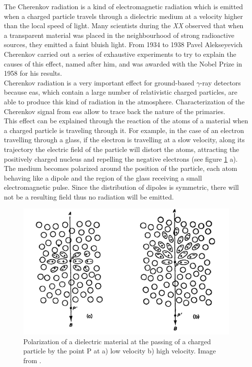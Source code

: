 \documentclass[main.tex]{subfiles}
\begin{document}
The Cherenkov radiation is a kind of electromagnetic radiation which is emitted when a charged particle travels through a dielectric medium at a velocity higher than the local speed of light. Many scientists during the \textit{XX}  observed that when a transparent material was placed in the neighbourhood of strong radioactive sources, they emitted a faint bluish light. From 1934 to 1938 Pavel Alekseyevich Cherenkov carried out a series of exhaustive experiments to try to explain the causes of this effect, named after him, and was awarded with the Nobel Prize in 1958 for his results.\\
Cherenkov radiation is a very important effect for ground-based $\gamma$-ray detectors because \gls{eas}, which contain a large number of relativistic charged particles, are able to produce this kind of radiation in the atmosphere. Characterization of the Cherenkov signal from \gls{eas} allow to trace back the nature of the primaries.\\
This effect can be explained through the reaction of the atoms of a material when a charged particle is traveling through it. For example, in the case of an electron travelling through a glass, if the electron is travelling at a slow velocity, along its trajectory the electric field of the particle will distort the atoms, attracting the positively charged nucleus and repelling the negative electrons (see figure \ref{fig:polarization} a). The medium becomes polarized around the position of the particle, each atom behaving like a dipole and the region of the glass receiving a small electromagnetic pulse. Since the distribution of dipoles  is symmetric, there will not be a resulting field thus no radiation will be emitted.

\begin{figure}[h]
    \centering
    \includegraphics[width=1\textwidth]{Pictures/polarization.pdf}
    \caption{Polarization of a dielectric material at the passing of a charged particle by the point P at a) low velocity b) high velocity. Image from \cite{jelley1958Cherenkov}.}
    \label{fig:polarization}
\end{figure}
\end{document}
